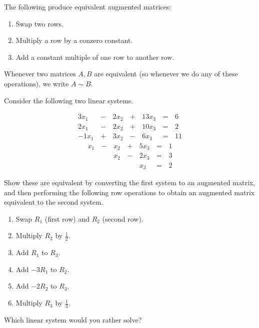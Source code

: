 
\begin{applicationActivities}{2}{4}

\begin{definition}
  The following  produce equivalent
  augmented matrices:
  \begin{enumerate}
    \item Swap two rows.
    \item Multiply a row by a conzero constant.
    \item Add a constant multiple of one row to another row.
  \end{enumerate}
  Whenever two matrices \(A,B\) are equivalent (so whenever we do any of
  these operations), we write \(A\sim B\).
\end{definition}

\begin{activity}{10}
  Consider the following two linear systems.
  \begin{multicols}{2}\noindent
    \begin{alignat*}{4}
      3x_1 &\,-\,& 2x_2 &\,+\,& 13x_3 &\,=\,& 6 \\
      2x_1 &\,-\,& 2x_2 &\,+\,& 10x_3 &\,=\,& 2 \\
     -1x_1 &\,+\,& 3x_2 &\,-\,&  6x_3 &\,=\,& 11
    \end{alignat*}
    \begin{alignat*}{4}
       x_1 &\,-\,&  x_2  &\,+\,&  5x_3 &\,=\,& 1 \\
           &\, \,&  x_2 &\,-\,&  2x_3 &\,=\,& 3 \\
           &\, \,&      &\, \,&   x_3 &\,=\,& 2
    \end{alignat*}
  \end{multicols}
  \begin{subactivity}
    Show these are equivalent by converting the first system to an augmented
    matrix, and then performing the following row operations to obtain
    an augmented matrix equivalent to the second system.
    \begin{multicols}{2}\noindent
    \begin{enumerate}
      \item Swap \(R_1\) (first row) and \(R_2\) (second row).
      \item Multiply \(R_2\) by \(\frac{1}{2}\).
      \item Add \(R_1\) to \(R_3\).
      \item Add \(-3R_1\) to \(R_2\).
      \item Add \(-2R_2\) to \(R_3\).
      \item Multiply \(R_3\) by \(\frac{1}{3}\).
    \end{enumerate}
    \end{multicols}
  \end{subactivity}
  \begin{subactivity}
    Which linear system would you rather solve?
  \end{subactivity}
\end{activity}


\end{applicationActivities}
